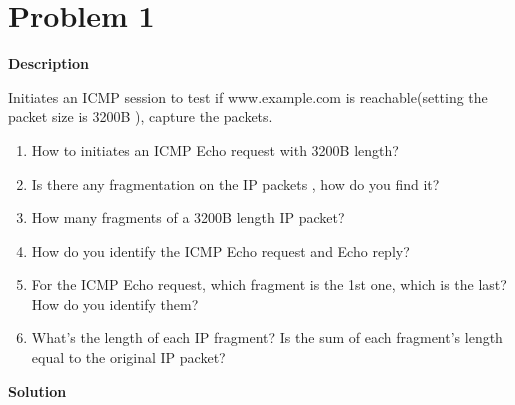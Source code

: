 \documentclass[12pt,letterpaper]{ctexart}
\begin{document}
\section*{Problem 1}

{\bf Description}

Initiates an ICMP session to test if www.example.com is reachable(setting the packet size is 3200B ), capture the packets.
\begin{enumerate}
  \item How to initiates an ICMP Echo request with 3200B length?
  \item Is there any fragmentation on the IP packets , how do you find it?
  \item How many fragments of a 3200B length IP packet?
  \item How do you identify the ICMP Echo request and Echo reply?
  \item For the ICMP Echo request, which fragment is the 1st one, which is the last? How do you identify them?
  \item What’s the length of each IP fragment? Is the sum of each fragment’s length equal to the original IP packet?
\end{enumerate}


{\bf Solution}
\end{document}
